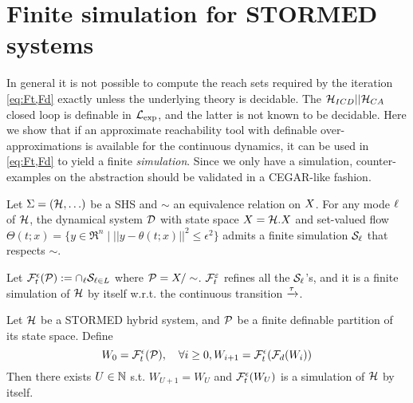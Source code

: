 \section{Finite simulation for STORMED systems}
\label{sec:simulationAprox}
In general it is not possible to compute the reach sets required by the iteration \eqref{eq:Ft,Fd} exactly unless the underlying theory is decidable.
The $\mathcal{H}_{ICD}||\mathcal{H}_{CA}$ closed loop is definable in $\mathcal{L}_{\exp}$, and the latter is not known to be decidable.
Here we show that if an approximate reachability tool with definable over-approximations is available for the continuous dynamics, it can be used in \eqref{eq:Ft,Fd} to yield a finite \emph{simulation}.
Since we only have a simulation, counter-examples on the abstraction should be validated in a CEGAR-like fashion.
\begin{lemma}
	\label{lemma:finite simu}
	Let $\Sigma = (\mathcal{H},\ldots)$ be a SHS and $\sim$ an equivalence relation on $X$.
	For any mode $\ell$ of $\mathcal{H}$, the dynamical system $\mathcal{D}$ with state space $X = \mathcal{H}.X$ and set-valued flow $\Theta(t;x) = \{y \in \Re^n \;|\; ||y-\theta(t;x)||^2 \leq \epsilon^2\}$ admits a finite simulation $\mathcal{S}_\ell$ that respects $\sim$.
\end{lemma}
Let $\mathcal{F}_t^\epsilon(\mathcal{P}) := \cap_{\ell}\mathcal{S}_{\ell \in L}$ where $\mathcal{P} = X/\sim$. $\mathcal{F}_t^\varepsilon$ refines all the $\mathcal{S}_\ell$'s, and it is a finite simulation of $\mathcal{H}$ by itself w.r.t. the continuous transition $\xrightarrow{\tau}$.

\begin{thm}
	\label{thm:finite simulation}
	Let $\mathcal{H}$ be a STORMED hybrid system, 
	and $\mathcal{P}$ be a finite definable partition of its state space.
	Define 
	\begin{equation}
	\label{eq:Fte,Fde}
W_0 = \mathcal{F}_t^\epsilon(\mathcal{P}), \quad \forall i\geq 0, W_{i+1} = \mathcal{F}_t^\epsilon(\mathcal{F}_d(W_i))
	\end{equation}
Then there exists $U \in \mathbb{N}$ s.t. $W_{U+1} = W_U$ and $\mathcal{F}_t^\epsilon(W_U)$ is a simulation of $\mathcal{H}$ by itself.
\end{thm}
